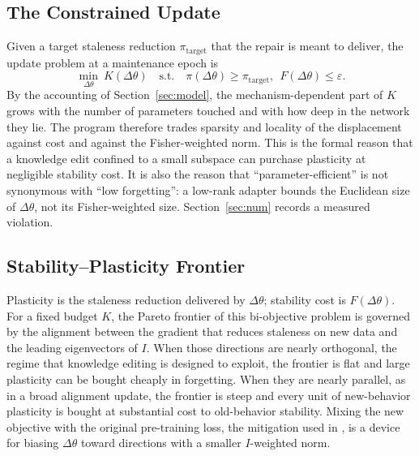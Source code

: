 \documentclass[journal]{IEEEtran}
\newcommand{\eps}{\varepsilon}
\begin{document}
\subsection{The Constrained Update}
Given a target staleness reduction $\pi_{\mathrm{target}}$ that the repair is meant to deliver, the update problem at a maintenance epoch is
\begin{equation}
\min_{\Delta\theta}\ K(\Delta\theta)\quad\text{s.t.}\quad \pi(\Delta\theta)\ge\pi_{\mathrm{target}},\ \ F(\Delta\theta)\le\eps.
\end{equation}
By the accounting of Section~\ref{sec:model}, the mechanism-dependent part of $K$ grows with the number of parameters touched and with how deep in the network they lie. The program therefore trades sparsity and locality of the displacement against cost and against the Fisher-weighted norm. This is the formal reason that a knowledge edit confined to a small subspace can purchase plasticity at negligible stability cost. It is also the reason that ``parameter-efficient'' is not synonymous with ``low forgetting'': a low-rank adapter bounds the Euclidean size of $\Delta\theta$, not its Fisher-weighted size. Section~\ref{sec:num} records a measured violation.

\subsection{Stability--Plasticity Frontier}
Plasticity is the staleness reduction delivered by $\Delta\theta$; stability cost is $F(\Delta\theta)$. For a fixed budget $K$, the Pareto frontier of this bi-objective problem is governed by the alignment between the gradient that reduces staleness on new data and the leading eigenvectors of $I$. When those directions are nearly orthogonal, the regime that knowledge editing is designed to exploit, the frontier is flat and large plasticity can be bought cheaply in forgetting. When they are nearly parallel, as in a broad alignment update, the frontier is steep and every unit of new-behavior plasticity is bought at substantial cost to old-behavior stability. Mixing the new objective with the original pre-training loss, the mitigation used in \cite{ouyang2022}, is a device for biasing $\Delta\theta$ toward directions with a smaller $I$-weighted norm.
\end{document}
